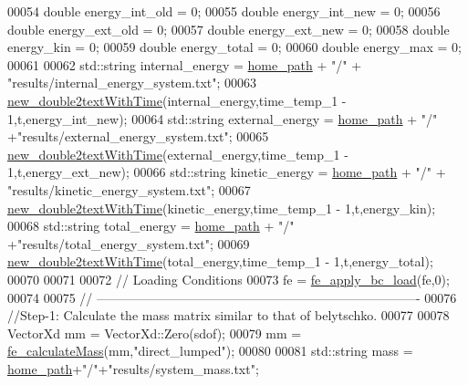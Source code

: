 \begin{DoxyCode}
00054     \textcolor{keywordtype}{double} energy\_int\_old = 0;
00055     \textcolor{keywordtype}{double} energy\_int\_new = 0;
00056     \textcolor{keywordtype}{double} energy\_ext\_old = 0;
00057     \textcolor{keywordtype}{double} energy\_ext\_new = 0;
00058     \textcolor{keywordtype}{double} energy\_kin = 0;
00059     \textcolor{keywordtype}{double} energy\_total = 0;
00060     \textcolor{keywordtype}{double} energy\_max = 0;
00061 
00062     std::string internal\_energy = \hyperlink{_global_variables_8h_a556ce46e457f991c51f3dac111579e2b}{home\_path} + \textcolor{stringliteral}{"/"} + \textcolor{stringliteral}{"results/internal\_energy\_system.txt"};
00063     \hyperlink{functions_8h_ad1e19649d167234a1357071888353496}{new\_double2textWithTime}(internal\_energy,time\_temp\_1 - 1,t,energy\_int\_new);
00064     std::string external\_energy = \hyperlink{_global_variables_8h_a556ce46e457f991c51f3dac111579e2b}{home\_path} + \textcolor{stringliteral}{"/"} +\textcolor{stringliteral}{"results/external\_energy\_system.txt"};
00065     \hyperlink{functions_8h_ad1e19649d167234a1357071888353496}{new\_double2textWithTime}(external\_energy,time\_temp\_1 - 1,t,energy\_ext\_new);
00066     std::string kinetic\_energy = \hyperlink{_global_variables_8h_a556ce46e457f991c51f3dac111579e2b}{home\_path} + \textcolor{stringliteral}{"/"} + \textcolor{stringliteral}{"results/kinetic\_energy\_system.txt"};
00067     \hyperlink{functions_8h_ad1e19649d167234a1357071888353496}{new\_double2textWithTime}(kinetic\_energy,time\_temp\_1 - 1,t,energy\_kin);
00068     std::string total\_energy = \hyperlink{_global_variables_8h_a556ce46e457f991c51f3dac111579e2b}{home\_path} + \textcolor{stringliteral}{"/"} +\textcolor{stringliteral}{"results/total\_energy\_system.txt"};
00069     \hyperlink{functions_8h_ad1e19649d167234a1357071888353496}{new\_double2textWithTime}(total\_energy,time\_temp\_1 - 1,t,energy\_total);
00070 
00071 
00072     \textcolor{comment}{// Loading Conditions}
00073     fe = \hyperlink{functions_8h_aba32cc24bd74a4965c560fa62c5b213e}{fe\_apply\_bc\_load}(fe,0);
00074 
00075     \textcolor{comment}{// ----------------------------------------------------------------------------}
00076     \textcolor{comment}{//Step-1: Calculate the mass matrix similar to that of belytschko.}
00077 
00078     VectorXd mm = VectorXd::Zero(sdof);
00079     mm = \hyperlink{functions_8h_abeed10bd80ae1f3c95d79c4aed512d8f}{fe\_calculateMass}(mm,\textcolor{stringliteral}{"direct\_lumped"});
00080 
00081     std::string mass = \hyperlink{_global_variables_8h_a556ce46e457f991c51f3dac111579e2b}{home\_path}+\textcolor{stringliteral}{"/"}+\textcolor{stringliteral}{"results/system\_mass.txt"};

\end{DoxyCode}
